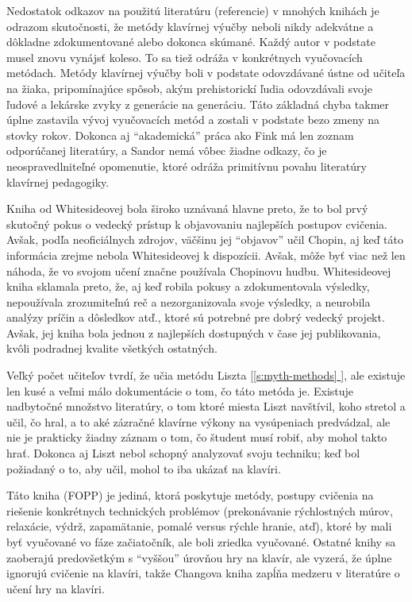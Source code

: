 \documentclass[11pt,a4paper]{book}
\newcommand*{\fullref}[1]{\hyperref[{#1}]{\ref*{#1} \nameref*{#1}}} %
\newcommand*{\fullrefp}[1]{[\fullref{#1}]} %
\begin{document}
Nedostatok odkazov na použitú literatúru (referencie) v mnohých knihách je odrazom skutočnosti, že metódy klavírnej výučby neboli nikdy adekvátne a dôkladne zdokumentované alebo dokonca skúmané. Každý autor v podstate musel znovu vynájsť koleso. To sa tiež odráža v konkrétnych vyučovacích metódach. Metódy klavírnej výučby boli v podstate odovzdávané ústne od učiteľa na žiaka, pripomínajúce spôsob, akým prehistorickí ľudia odovzdávali svoje ľudové a lekárske zvyky z generácie na generáciu. Táto základná chyba takmer úplne zastavila vývoj vyučovacích metód a zostali v podstate bezo zmeny na stovky rokov. Dokonca aj “akademická” práca ako Fink má len zoznam odporúčanej literatúry, a Sandor nemá vôbec žiadne odkazy, čo je neospravedlniteľné opomenutie, ktoré odráža primitívnu povahu literatúry klavírnej pedagogiky. 

Kniha od Whitesideovej bola široko uznávaná hlavne preto, že to bol prvý skutočný pokus o vedecký prístup k objavovaniu najlepších postupov cvičenia. Avšak, podľa neoficiálnych zdrojov, väčšinu jej “objavov” učil Chopin, aj keď táto informácia zrejme nebola Whitesideovej k dispozícii. Avšak, môže byť viac než len náhoda, že vo svojom učení značne používala Chopinovu hudbu. Whitesideovej kniha sklamala preto, že, aj keď robila pokusy a zdokumentovala výsledky, nepoužívala zrozumiteľnú reč a nezorganizovala svoje výsledky, a neurobila analýzy príčin a dôsledkov atď., ktoré sú potrebné pre dobrý vedecký projekt. Avšak, jej kniha bola jednou z najlepších dostupných v čase jej publikovania, kvôli podradnej kvalite všetkých ostatných. 

Veľký počet učiteľov tvrdí, že učia metódu Liszta \fullrefp{s:myth-methods}, ale existuje len kusé a veľmi málo dokumentácie o tom, čo táto metóda je. Existuje nadbytočné množstvo literatúry, o tom ktoré miesta Liszt navštívil, koho stretol a učil, čo hral, a to aké zázračné klavírne výkony na vysúpeniach predvádzal, ale nie je prakticky žiadny záznam o tom, čo študent musí robiť, aby mohol takto hrať. Dokonca aj Liszt nebol schopný analyzovať svoju techniku; keď bol požiadaný o to, aby učil, mohol to iba ukázať na klavíri. 

Táto kniha (FOPP) je jediná, ktorá poskytuje metódy, postupy cvičenia na riešenie konkrétnych technických problémov (prekonávanie rýchlostných múrov, relaxácie, výdrž, zapamätanie, pomalé versus rýchle hranie, atď), ktoré by mali byť vyučované vo fáze začiatočník, ale boli zriedka vyučované. Ostatné knihy sa zaoberajú predovšetkým s “vyššou” úrovňou hry na klavír, ale vyzerá, že úplne ignorujú cvičenie na klavíri, takže Changova kniha zapĺňa medzeru v literatúre o učení hry na klavíri. 
\end{document}
